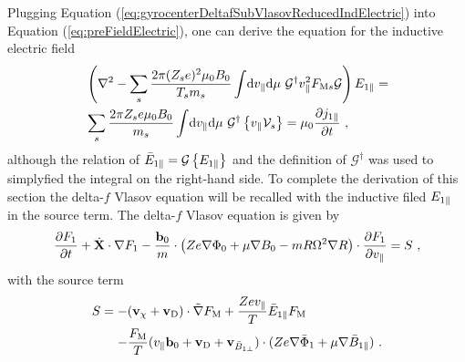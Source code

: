 Plugging Equation (\ref{eq:gyrocenterDeltafSubVlasovReducedIndElectric}) into Equation (\ref{eq:preFieldElectric}), one can derive the equation for the inductive electric field 
\begin{gather}
	\begin{aligned}
		&\left(\nabla^2 - \sum_s \frac{2\pi (Z_se)^2 \mu_0 B_0}{T_sm_s} \int \! \mathrm{d}v_\parallel\mathrm{d}\mu ~ \mathcal{G}^\dagger v_\parallel^2 F_{\mathrm{M}s} \mathcal{G}\right) E_{1\parallel} = \\
		&\sum_s \frac{2\pi Z_se \mu_0 B_0}{m_s}  \int \! \mathrm{d}v_\parallel\mathrm{d}\mu ~ \mathcal{G}^\dagger \left\{v_\parallel \mathcal{V}_s\right\} = \mu_0 \frac{\partial j_{1\parallel}}{\partial t}~,
	\end{aligned}
	\label{eq:fieldElectric}
\end{gather}
although the relation of $\bar{E}_{1\parallel} =  \mathcal{G} \left\{E_{1\parallel}\right\}$ and the definition of $\mathcal{G}^\dagger$ was used to simplyfied the integral on the right-hand side. To complete the derivation of this section the delta-\!$f$ Vlasov equation will be recalled with the inductive filed $E_{1\parallel}$ in the source term. The delta-\!$f$ Vlasov equation is given by
\begin{gather}
	\frac{\partial F_1}{\partial t} + \dot{\boldsymbol{\mathbf{X}}} \cdot \nabla F_1 - \frac{\boldsymbol{\mathbf{b}}_0}{m} \cdot \left(Ze\nabla \Phi_0 + \mu \nabla B_0 - mR \Omega^2 \nabla R \right) \cdot \frac{\partial F_1}{\partial v_\parallel} = S~,
	\label{eq:gyrocenterDeltafSubVlasovRecall}
\end{gather}
with the source term
\begin{gather}
	\begin{aligned}
		S = -& (\boldsymbol{\mathbf{v}}_\chi + \boldsymbol{\mathbf{v}}_\mathrm{D}) \cdot \tilde{\nabla} F_\mathrm{M} + \frac{Z e v_\parallel}{T} \bar{E}_{1\parallel} F_\mathrm{M} \\
		    -& \frac{F_\mathrm{M}}{T} (v_\parallel \boldsymbol{\mathbf{b}}_0 + \boldsymbol{\mathbf{v}}_\mathrm{D} + \boldsymbol{\mathbf{v}}_{\bar{B}_{1\perp}}) \cdot (Z e \nabla \bar{\Phi}_1 + \mu \nabla \bar{B}_{1\parallel})~.
	\end{aligned}
	\label{eq:sourceTermElectric}
\end{gather}

